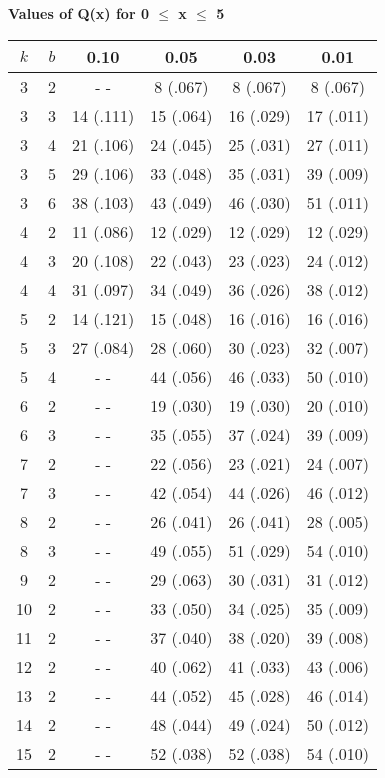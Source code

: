 \documentclass{article}
\begin{document}
\thispagestyle{empty}

\begin{center}
  {\small\textbf{Values of Q(x) for 0 $\le$ x $\le$ 5}}
\end{center}

\begin{center}
\begin{tabular}{|cc|cc|cc|} \hline

\hline
$k$&$b$&  0.10     & 0.05      & 0.03      & 0.01      \\ \hline
 3 & 2 & - -       &  8 (.067) &  8 (.067) &  8 (.067) \\
 3 & 3 & 14 (.111) & 15 (.064) & 16 (.029) & 17 (.011) \\
 3 & 4 & 21 (.106) & 24 (.045) & 25 (.031) & 27 (.011) \\
 3 & 5 & 29 (.106) & 33 (.048) & 35 (.031) & 39 (.009) \\
 3 & 6 & 38 (.103) & 43 (.049) & 46 (.030) & 51 (.011) \\
 4 & 2 & 11 (.086) & 12 (.029) & 12 (.029) & 12 (.029) \\
 4 & 3 & 20 (.108) & 22 (.043) & 23 (.023) & 24 (.012) \\
 4 & 4 & 31 (.097) & 34 (.049) & 36 (.026) & 38 (.012) \\
 5 & 2 & 14 (.121) & 15 (.048) & 16 (.016) & 16 (.016) \\
 5 & 3 & 27 (.084) & 28 (.060) & 30 (.023) & 32 (.007) \\
 5 & 4 & - -       & 44 (.056) & 46 (.033) & 50 (.010) \\
 6 & 2 & - -       & 19 (.030) & 19 (.030) & 20 (.010) \\
 6 & 3 & - -       & 35 (.055) & 37 (.024) & 39 (.009) \\
 7 & 2 & - -       & 22 (.056) & 23 (.021) & 24 (.007) \\
 7 & 3 & - -       & 42 (.054) & 44 (.026) & 46 (.012) \\
 8 & 2 & - -       & 26 (.041) & 26 (.041) & 28 (.005) \\
 8 & 3 & - -       & 49 (.055) & 51 (.029) & 54 (.010) \\
 9 & 2 & - -       & 29 (.063) & 30 (.031) & 31 (.012) \\
10 & 2 & - -       & 33 (.050) & 34 (.025) & 35 (.009) \\
11 & 2 & - -       & 37 (.040) & 38 (.020) & 39 (.008) \\
12 & 2 & - -       & 40 (.062) & 41 (.033) & 43 (.006) \\
13 & 2 & - -       & 44 (.052) & 45 (.028) & 46 (.014) \\
14 & 2 & - -       & 48 (.044) & 49 (.024) & 50 (.012) \\
15 & 2 & - -       & 52 (.038) & 52 (.038) & 54 (.010) \\ \hline
\end{tabular}
\end{center}
\end{document}
